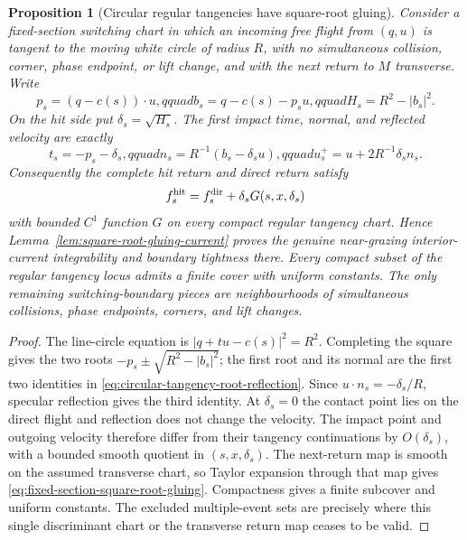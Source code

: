 \documentclass[11pt]{article}
\newtheorem{proposition}[theorem]{Proposition}
\begin{document}
\begin{proposition}[Circular regular tangencies have square-root gluing]
\label{prop:fixed-section-square-root-tangency}
Consider a fixed-section switching chart in which an incoming free flight
from $(q,u)$ is tangent to the moving white circle of radius $R$, with no
simultaneous collision, corner, phase endpoint, or lift change, and with the
next return to $M$ transverse.  Write
\begin{equation}
\label{eq:circular-tangency-discriminant}
 p_s=(q-c(s))\cdot u,qquad
 b_s=q-c(s)-p_su,qquad
 H_s=R^2-|b_s|^2.
\end{equation}
On the hit side put $\delta_s=\sqrt{H_s}$.  The first impact time, normal,
and reflected velocity are exactly
\begin{equation}
\label{eq:circular-tangency-root-reflection}
 t_s=-p_s-\delta_s,qquad
 n_s=R^{-1}(b_s-\delta_su),qquad
 u_s^+=u+2R^{-1}\delta_sn_s.
\end{equation}
Consequently the complete hit return and direct return satisfy
\begin{equation}
\label{eq:fixed-section-square-root-gluing}
 f_s^{\rm hit}=f_s^{\rm dir}
 +\delta_sG(s,x,\delta_s)
\end{equation}
with bounded $C^1$ function $G$ on every compact regular tangency chart.
Hence Lemma~\ref{lem:square-root-gluing-current} proves the genuine
near-grazing interior-current integrability and boundary tightness there.
Every compact subset of the regular tangency locus admits a finite cover
with uniform constants.  The only remaining switching-boundary pieces are
neighbourhoods of simultaneous collisions, phase endpoints, corners, and
lift changes.
\end{proposition}

\begin{proof}
The line-circle equation is
$|q+tu-c(s)|^2=R^2$.  Completing the square gives the two roots
$-p_s\pm\sqrt{R^2-|b_s|^2}$; the first root and its normal are the first two
identities in \eqref{eq:circular-tangency-root-reflection}.  Since
$u\cdot n_s=-\delta_s/R$, specular reflection gives the third identity.
At $\delta_s=0$ the contact point lies on the direct flight and reflection
does not change the velocity.  The impact point and outgoing velocity
therefore differ from their tangency continuations by $O(\delta_s)$, with a
bounded smooth quotient in $(s,x,\delta_s)$.  The next-return map is smooth
on the assumed transverse chart, so Taylor expansion through that map gives
\eqref{eq:fixed-section-square-root-gluing}.  Compactness gives a finite
subcover and uniform constants.  The excluded multiple-event sets are
precisely where this single discriminant chart or the transverse return map
ceases to be valid.
\end{proof}
\end{document}
